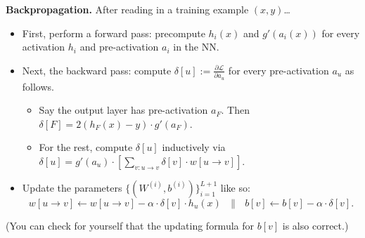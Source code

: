 \textbf{Backpropagation.}
After reading in a training example $(x, y)$\dots
\begin{itemize}
    \item First, perform a forward pass:
    precompute $h_i(x)$ and $g'(a_i(x))$
    for every activation $h_i$ and pre-activation $a_i$
    in the NN.
    \item Next, the backward pass: compute
    $\delta[u] := \frac{\partial \mathcal{L}}{\partial a_u}$
    for every pre-activation $a_u$ as follows.
    \begin{itemize}
        \item Say the output layer
        has pre-activation $a_F$.
        Then $\delta[F] = 2(h_F(x) - y) \cdot g'(a_F)$.
        \item For the rest, compute $\delta[u]$ inductively
        via $\delta[u] = g'(a_u) \cdot
        \left[
            \sum_{v \colon u \to v} \delta[v] \cdot w[u \to v]
        \right]$.
    \end{itemize}
    \item Update the parameters
    $\{(W^{(i)}, b^{(i)})\}_{i = 1}^{L + 1}$ like so:
    \[ w[u \to v] \gets w[u \to v] -
    \alpha \cdot \delta[v] \cdot h_u(x)
    ~~~ \parallel ~~~
    b[v] \gets b[v] - \alpha \cdot \delta[v]. \]
\end{itemize}
(You can check for yourself that
the updating formula for $b[v]$
is also correct.)

